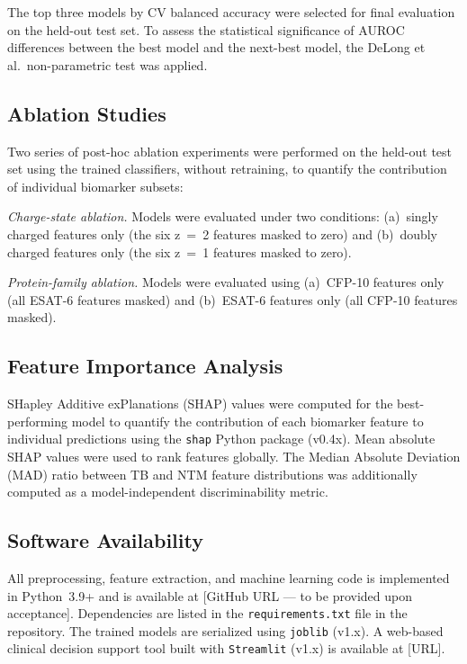 \documentclass[journal=ancham, manuscript=article, layout=traditional]{achemso}
\begin{document}
The top three models by CV balanced accuracy were selected for final
evaluation on the held-out test set.
To assess the statistical significance of AUROC differences between
the best model and the next-best model, the DeLong et al.\ non-parametric
test was applied.\cite{DeLong1988}

\subsection{Ablation Studies}

Two series of post-hoc ablation experiments were performed on the
held-out test set using the trained classifiers, without
retraining, to quantify the contribution of individual biomarker
subsets:

\textit{Charge-state ablation.}
Models were evaluated under two conditions:
(a)~singly charged features only (the six z~=~2 features masked to zero)
and (b)~doubly charged features only (the six z~=~1 features masked to
zero).

\textit{Protein-family ablation.}
Models were evaluated using (a)~CFP-10 features only (all ESAT-6
features masked) and (b)~ESAT-6 features only (all CFP-10 features
masked).

\subsection{Feature Importance Analysis}

SHapley Additive exPlanations (SHAP) values\cite{Lundberg2017SHAP} were
computed for the best-performing model to quantify the contribution
of each biomarker feature to individual predictions using the
\texttt{shap} Python package (v0.4x).
Mean absolute SHAP values were used to rank features globally.
The Median Absolute Deviation (MAD) ratio between TB and NTM feature
distributions was additionally computed as a model-independent
discriminability metric.

\subsection{Software Availability}

All preprocessing, feature extraction, and machine learning code is
implemented in Python~3.9+ and is available at
[GitHub URL --- to be provided upon acceptance].
Dependencies are listed in the \texttt{requirements.txt} file
in the repository.
The trained models are serialized using \texttt{joblib} (v1.x).
A web-based clinical decision support tool built with
\texttt{Streamlit} (v1.x) is available at [URL].
\end{document}
